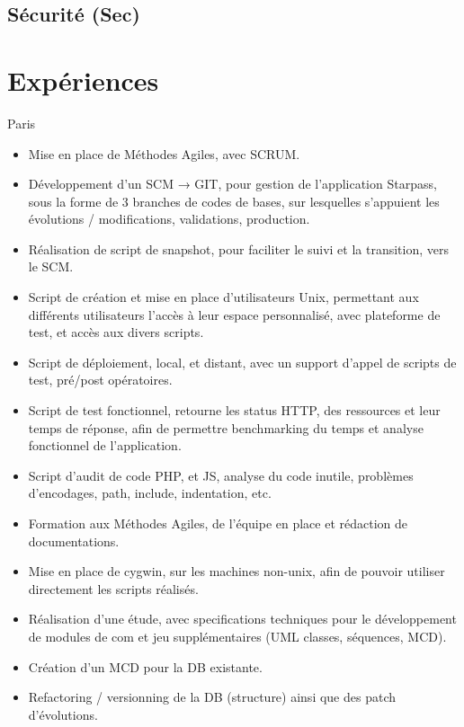 \documentclass[10pt,a4paper,sans]{moderncv}
\begin{document}
\subsection{Sécurité (Sec)}

\section{Expériences}

{Paris}{
    \begin{itemize}%
        \item Mise en place de Méthodes Agiles, avec SCRUM.
        \item Développement d'un SCM → GIT, pour gestion de l'application Starpass, sous la forme de 3 branches de codes de bases, sur lesquelles s'appuient les évolutions / modifications, validations, production.
        \item Réalisation de script de snapshot, pour faciliter le suivi et la transition, vers le SCM.
        \item Script de création et mise en place d'utilisateurs Unix, permettant aux différents utilisateurs l'accès à leur espace personnalisé, avec plateforme de test, et accès aux divers scripts.
        \item Script de déploiement, local, et distant, avec un support d'appel de scripts de test, pré/post opératoires.
        \item Script de test fonctionnel, retourne les status HTTP, des ressources et leur temps de réponse, afin de permettre benchmarking du temps et analyse fonctionnel de l'application.
        \item Script d'audit de code PHP, et JS, analyse du code inutile, problèmes d'encodages, path, include, indentation, etc.
        \item Formation aux Méthodes Agiles, de l'équipe en place et rédaction de documentations.
        \item Mise en place de cygwin, sur les machines non-unix, afin de pouvoir utiliser directement les scripts réalisés.
        \item Réalisation d'une étude, avec specifications techniques pour le développement de modules de com et jeu supplémentaires (UML classes, séquences, MCD).
        \item Création d'un MCD pour la DB existante.
        \item Refactoring / versionning de la DB (structure) ainsi que des patch d'évolutions.

\end{itemize}}
\end{document}
